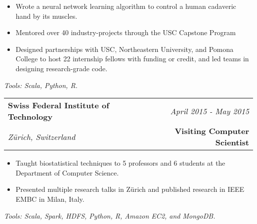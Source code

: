 \documentclass[10pt,a4paper]{article}
\begin{document}
  \vspace*{1mm}\noindent\begin{minipage}{17cm}
    \begin{itemize}[leftmargin=6mm,topsep=0mm,itemsep=-1mm]
      \item Wrote a neural network learning algorithm to control a human cadaveric hand by its muscles. 
      \item Mentored over 40 industry-projects through the USC Capstone Program
      \item Designed partnerships with USC, Northeastern University, and Pomona College to host 22 internship fellows with funding or credit, and led teams in designing research-grade code.
    \end{itemize}
  \end{minipage}

  \vspace*{2mm}\setlength\parindent{2mm}\begin{minipage}{16.8cm}
    \textit{Tools: Scala, Python, R.}
  \end{minipage}


  \vspace*{3mm}\noindent\begin{tabularx}{17cm}{X r}
    \textbf{Swiss Federal Institute of Technology} & \textit{April 2015 - May 2015} \\
    \textit{Z{\"u}rich, Switzerland} & \textbf{Visiting Computer Scientist} \\
  \end{tabularx}

  \vspace*{1mm}\noindent\begin{minipage}{17cm}
    \begin{itemize}[leftmargin=6mm,topsep=0mm,itemsep=-1mm]
      \item Taught biostatistical techniques to 5 professors and 6 students at the Department of Computer Science. 
      \item Presented multiple research talks in Z{\"u}rich and published research in IEEE EMBC in Milan, Italy.
    \end{itemize}
  \end{minipage}

  \vspace*{2mm}\setlength\parindent{2mm}\begin{minipage}{16.8cm}
    \textit{Tools: Scala, Spark, HDFS, Python, R, Amazon EC2, and MongoDB.}
  \end{minipage}
\end{document}
